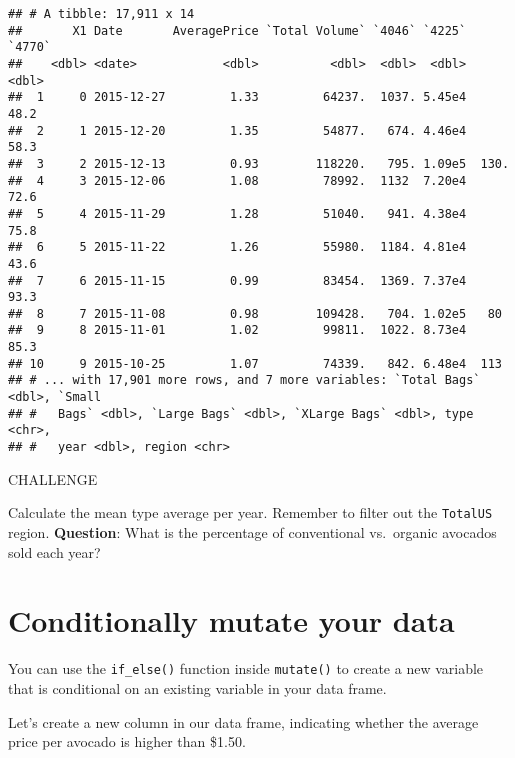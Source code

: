 \documentclass[]{book}
\newenvironment{Shaded}{\begin{snugshade}}{\end{snugshade}}
\newcommand{\DataTypeTok}[1]{\textcolor[rgb]{0.13,0.29,0.53}{#1}}
\newcommand{\DecValTok}[1]{\textcolor[rgb]{0.00,0.00,0.81}{#1}}
\newcommand{\FloatTok}[1]{\textcolor[rgb]{0.00,0.00,0.81}{#1}}
\newcommand{\KeywordTok}[1]{\textcolor[rgb]{0.13,0.29,0.53}{\textbf{#1}}}
\newcommand{\NormalTok}[1]{#1}
\newcommand{\OperatorTok}[1]{\textcolor[rgb]{0.81,0.36,0.00}{\textbf{#1}}}
\newcommand{\StringTok}[1]{\textcolor[rgb]{0.31,0.60,0.02}{#1}}
\begin{document}
\begin{verbatim}
## # A tibble: 17,911 x 14
##       X1 Date       AveragePrice `Total Volume` `4046` `4225` `4770`
##    <dbl> <date>            <dbl>          <dbl>  <dbl>  <dbl>  <dbl>
##  1     0 2015-12-27         1.33         64237.  1037. 5.45e4   48.2
##  2     1 2015-12-20         1.35         54877.   674. 4.46e4   58.3
##  3     2 2015-12-13         0.93        118220.   795. 1.09e5  130. 
##  4     3 2015-12-06         1.08         78992.  1132  7.20e4   72.6
##  5     4 2015-11-29         1.28         51040.   941. 4.38e4   75.8
##  6     5 2015-11-22         1.26         55980.  1184. 4.81e4   43.6
##  7     6 2015-11-15         0.99         83454.  1369. 7.37e4   93.3
##  8     7 2015-11-08         0.98        109428.   704. 1.02e5   80  
##  9     8 2015-11-01         1.02         99811.  1022. 8.73e4   85.3
## 10     9 2015-10-25         1.07         74339.   842. 6.48e4  113  
## # ... with 17,901 more rows, and 7 more variables: `Total Bags` <dbl>, `Small
## #   Bags` <dbl>, `Large Bags` <dbl>, `XLarge Bags` <dbl>, type <chr>,
## #   year <dbl>, region <chr>
\end{verbatim}

\leavevmode\hypertarget{challenge}{}%
CHALLENGE

Calculate the mean type average per year. Remember to filter out the \texttt{TotalUS} region. \textbf{Question}: What is the percentage of conventional vs.~organic avocados sold each year?

\hypertarget{conditionally-mutate-your-data}{%
\section{Conditionally mutate your data}\label{conditionally-mutate-your-data}}

You can use the \texttt{if\_else()} function inside \texttt{mutate()} to create a new variable that is conditional on an existing variable in your data frame.

Let's create a new column in our data frame, indicating whether the average price per avocado is higher than \$1.50.

\begin{Shaded}
\end{Shaded}
\end{document}
